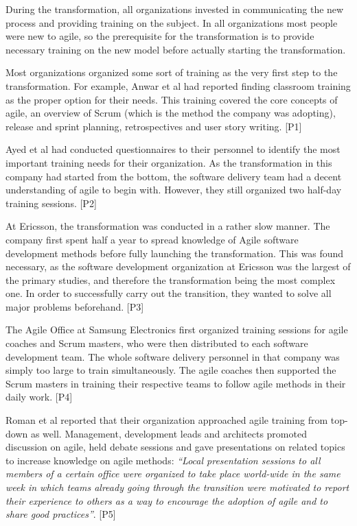 During the transformation, all organizations invested in communicating
the new process and providing training on the subject. In all
organizations most people were new to agile, so the prerequisite for the
transformation is to provide necessary training on the new model before
actually starting the transformation.

Most organizations organized some sort of training as the very first
step to the transformation. For example, Anwar et al had reported
finding classroom training as the proper option for their needs. This
training covered the core concepts of agile, an overview of Scrum (which
is the method the company was adopting), release and sprint planning,
retrospectives and user story writing. [P1]

Ayed et al had conducted questionnaires to their personnel to identify
the most important training needs for their organization. As the
transformation in this company had started from the bottom, the software
delivery team had a decent understanding of agile to begin with.
However, they still organized two half-day training sessions. [P2]

At Ericsson, the transformation was conducted in a rather slow manner.
The company first spent half a year to spread knowledge of Agile
software development methods before fully launching the transformation.
This was found necessary, as the software development organization at
Ericsson was the largest of the primary studies, and therefore the
transformation being the most complex one. In order to successfully
carry out the transition, they wanted to solve all major problems
beforehand. [P3]

The Agile Office at Samsung Electronics first organized training
sessions for agile coaches and Scrum masters, who were then distributed
to each software development team. The whole software delivery personnel
in that company was simply too large to train simultaneously. The agile
coaches then supported the Scrum masters in training their respective
teams to follow agile methods in their daily work. [P4]

Roman et al reported that their organization approached agile
training from top-down as well. Management, development leads and
architects promoted discussion on agile, held debate sessions and gave
presentations on related topics to increase knowledge on agile methods:
\textit{``Local presentation sessions to all members of a certain office
were organized to take place world-wide in the same week in which teams
already going through the transition were motivated to report their
experience to others as a way to encourage the adoption of agile and to
share good practices''}. [P5]
